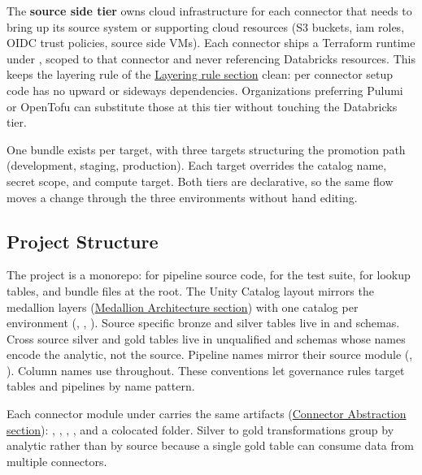 The \textbf{source side tier} owns cloud infrastructure for each connector that needs to bring up its source system or supporting cloud resources (S3 buckets, \gls{iam} roles, OIDC trust policies, source side VMs). Each connector ships a Terraform runtime under \allowbreak{}, scoped to that connector and never referencing Databricks resources. This keeps the layering rule of the \hyperref[sec:impl-layering-rule]{Layering rule section} clean: per connector setup code has no upward or sideways dependencies. Organizations preferring Pulumi or OpenTofu can substitute those at this tier without touching the Databricks tier.

One bundle exists per target, with three targets structuring the promotion path (development, staging, production). Each target overrides the catalog name, secret scope, and compute target. Both tiers are declarative, so the same flow moves a change through the three environments without hand editing.


\subsection{Project Structure}
\label{sec:project-structure}

The project is a monorepo:  for pipeline source code,  for the test suite,  for lookup tables, and bundle files at the root. The Unity Catalog layout mirrors the medallion layers (\hyperref[sec:medallion-arch]{Medallion Architecture section}) with one catalog per environment (, , ). Source specific bronze and silver tables live in  and  schemas. Cross source silver and gold tables live in unqualified  and  schemas whose names encode the analytic, not the source. Pipeline names mirror their source module (, ). Column names use  throughout. These conventions let governance rules target tables and pipelines by name pattern.

Each connector module under  carries the same artifacts (\hyperref[sec:connector-abstraction]{Connector Abstraction section}): , , , , and a colocated  folder. Silver to gold transformations group by analytic rather than by source because a single gold table can consume data from multiple connectors.

